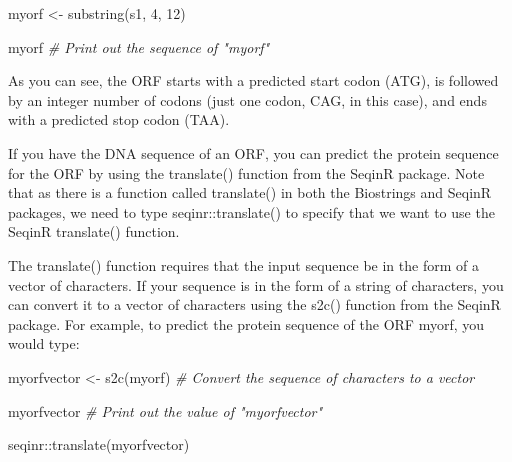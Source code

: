 \documentclass[
]{book}
\newenvironment{Shaded}{\begin{snugshade}}{\end{snugshade}}
\newcommand{\CommentTok}[1]{\textcolor[rgb]{0.56,0.35,0.01}{\textit{#1}}}
\newcommand{\DecValTok}[1]{\textcolor[rgb]{0.00,0.00,0.81}{#1}}
\newcommand{\FunctionTok}[1]{\textcolor[rgb]{0.00,0.00,0.00}{#1}}
\newcommand{\NormalTok}[1]{#1}
\newcommand{\OtherTok}[1]{\textcolor[rgb]{0.56,0.35,0.01}{#1}}
\newcommand{\SpecialCharTok}[1]{\textcolor[rgb]{0.00,0.00,0.00}{#1}}
\begin{document}
\begin{Shaded}
\begin{Highlighting}[]
\NormalTok{myorf }\OtherTok{\textless{}{-}} \FunctionTok{substring}\NormalTok{(s1, }\DecValTok{4}\NormalTok{, }\DecValTok{12}\NormalTok{)}
\end{Highlighting}
\end{Shaded}

\begin{Shaded}
\begin{Highlighting}[]
\NormalTok{myorf }\CommentTok{\# Print out the sequence of "myorf"}
\end{Highlighting}
\end{Shaded}

As you can see, the ORF starts with a predicted start codon (ATG), is followed by an integer number of codons (just one codon, CAG, in this case), and ends with a predicted stop codon (TAA).

If you have the DNA sequence of an ORF, you can predict the protein sequence for the ORF by using the translate() function from the SeqinR package. Note that as there is a function called translate() in both the Biostrings and SeqinR packages, we need to type seqinr::translate() to specify that we want to use the SeqinR translate() function.

The translate() function requires that the input sequence be in the form of a vector of characters. If your sequence is in the form of a string of characters, you can convert it to a vector of characters using the s2c() function from the SeqinR package. For example, to predict the protein sequence of the ORF myorf, you would type:

\begin{Shaded}
\begin{Highlighting}[]
\NormalTok{myorfvector }\OtherTok{\textless{}{-}} \FunctionTok{s2c}\NormalTok{(myorf) }\CommentTok{\# Convert the sequence of characters to a vector}
\end{Highlighting}
\end{Shaded}

\begin{Shaded}
\begin{Highlighting}[]
\NormalTok{myorfvector               }\CommentTok{\# Print out the value of "myorfvector"}
\end{Highlighting}
\end{Shaded}

\begin{Shaded}
\begin{Highlighting}[]
\NormalTok{seqinr}\SpecialCharTok{::}\FunctionTok{translate}\NormalTok{(myorfvector)}
\end{Highlighting}
\end{Shaded}
\end{document}
